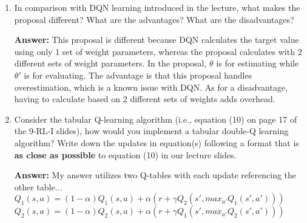 \documentclass{assignment}
\begin{document}
\begin{problem}
\begin{enumerate}
\begin{enumerate}[label=(\alph*)]
    
        \item In comparison with DQN learning introduced in the lecture, what makes the proposal different? What are the advantages? What are the disadvantages?

        \color{blue}\textbf{Answer:} 
            This proposal is different because DQN calculates the target value using only 1 set of weight parameters, whereas the proposal calculates with 2 different sets of weight parameters. In the proposal, $\theta$ is for estimating while $\theta'$ is for evaluating. The advantage is that this proposal handles overestimation, which is a known issue with DQN. As for a disadvantage, having to calculate based on 2 different sets of weights adds overhead.
        \color{black}


    
        \item Consider the tabular Q-learning algorithm (i.e., equation (10) on page 17 of the 9-RL-I slides), how would you implement a tabular double-Q learning algorithm? Write down the updates in equation(s) following a format that is \textbf{as close as possible} to equation (10) in our lecture slides.

        \color{blue}\textbf{Answer:} My answer utilizes two Q-tables with each update referencing the other table...\\
            $Q_1(s,a) = (1 - \alpha)Q_1(s,a) + \alpha(r + \gamma Q_2(s', max_{a'} Q_1(s',a')))$\\
            $Q_2(s,a) = (1 - \alpha)Q_2(s,a) + \alpha(r + \gamma Q_1(s', max_{a'} Q_2(s',a')))$
        \color{black}


    \end{enumerate}
\end{enumerate}
\end{problem}
\end{document}
